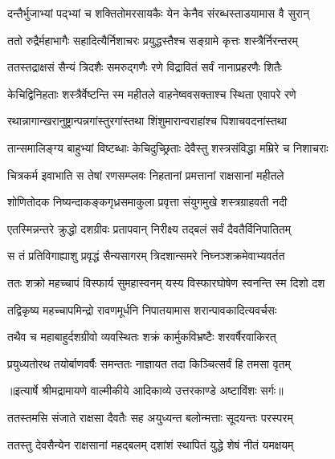 \twolineshloka
{दन्तैर्भुजाभ्यां पद्भ्यां च शक्तितोमरसायकैः}
{येन केनैव संरब्धस्ताडयामास वै सुरान्} %

\twolineshloka
{ततो रुद्रैर्महाभागैः सहादित्यैर्निशाचरः}
{प्रयुद्धस्तैश्च सङ्ग्रामे कृत्तः शस्त्रैर्निरन्तरम्} %

\twolineshloka
{ततस्तद्राक्षसं सैन्यं त्रिदशैः समरुद्गणैः}
{रणे विद्रावितं सर्वं नानाप्रहरणैः शितैः} %

\twolineshloka
{केचिद्विनिहताः शस्त्रैर्वेष्टन्ति स्म महीतले}
{वाहनेष्ववसक्ताश्च स्थिता एवापरे रणे} %

\twolineshloka
{रथान्नागान्खरानुष्ट्रान्पन्नगांस्तुरगांस्तथा}
{शिंशुमारान्वराहांश्च पिशाचवदनांस्तथा} %

\twolineshloka
{तान्समालिङ्ग्य बाहुभ्यां विष्टब्धाः केचिदुच्छ्रिताः}
{देवैस्तु शस्त्रसंविद्धा मम्रिरे च निशाचराः} %

\twolineshloka
{चित्रकर्म इवाभाति स तेषां रणसम्प्लवः}
{निहतानां प्रमत्तानां राक्षसानां महीतले} %

\twolineshloka
{शोणितोदक निष्यन्दाकङ्कगृध्रसमाकुला}
{प्रवृत्ता संयुगमुखे शस्त्रग्राहवती नदी} %

\twolineshloka
{एतस्मिन्नन्तरे क्रुद्धो दशग्रीवः प्रतापवान्}
{निरीक्ष्य तद्बलं सर्वं दैवतैर्विनिपातितम्} %

\twolineshloka
{स तं प्रतिविगाह्याशु प्रवृद्धं सैन्यसागरम्}
{त्रिदशान्समरे निघ्नञ्शक्रमेवाभ्यवर्तत} %

\twolineshloka
{ततः शक्रो महच्चापं विस्फार्य सुमहास्वनम्}
{यस्य विस्फारघोषेण स्वनन्ति स्म दिशो दश} %

\twolineshloka
{तद्विकृष्य महच्चापमिन्द्रो रावणमूर्धनि}
{निपातयामास शरान्पावकादित्यवर्चसः} %

\twolineshloka
{तथैव च महाबाहुर्दशग्रीवो व्यवस्थितः}
{शक्रं कार्मुकविभ्रष्टैः शरवर्षैरवाकिरत्} %

\twolineshloka
{प्रयुध्यतोरथ तयोर्बाणवर्षैः समन्ततः}
{नाज्ञायत तदा किञ्चित्सर्वं हि तमसा वृतम्} %


{॥इत्यार्षे श्रीमद्रामायणे वाल्मीकीये आदिकाव्ये उत्तरकाण्डे अष्टाविंशः सर्गः॥}


\twolineshloka
{ततस्तमसि संजाते राक्षसा दैवतैः सह}
{अयुध्यन्त बलोन्मत्ताः सूदयन्तः परस्परम्} %

\twolineshloka
{ततस्तु देवसैन्येन राक्षसानां महद्बलम्}
{दशांशं स्थापितं युद्धे शेषं नीतं यमक्षयम्} %

